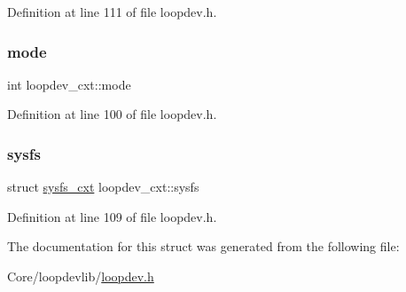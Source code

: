 Definition at line 111 of file loopdev.\+h.

\mbox{\label{structloopdev__cxt_a84ed3dd30a6f97b7deb2910a757589ff}} 
\subsubsection{\texorpdfstring{mode}{mode}}
{\footnotesize\ttfamily int loopdev\+\_\+cxt\+::mode}



Definition at line 100 of file loopdev.\+h.

\mbox{\label{structloopdev__cxt_a77c2fc4d86bea224430b83cdade26de5}} 
\subsubsection{\texorpdfstring{sysfs}{sysfs}}
{\footnotesize\ttfamily struct \hyperlink{structsysfs__cxt}{sysfs\+\_\+cxt} loopdev\+\_\+cxt\+::sysfs}



Definition at line 109 of file loopdev.\+h.



The documentation for this struct was generated from the following file\+:\begin{DoxyCompactItemize}
\item 
Core/loopdevlib/\hyperlink{loopdev_8h}{loopdev.\+h}\end{DoxyCompactItemize}
